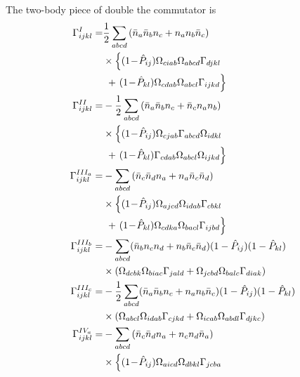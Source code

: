 \documentclass[11pt]{article}
\newcommand{\MyRomanNum}[1]{%
\ifcase#1\or I\or II\or III\or IV\or V\or VI\or VII\or VIII\or IX\or X\else #1\fi}
\begin{document}
The two-body piece of double the commutator is
\begin{subequations}\allowdisplaybreaks[4]\label{DoubleCommutator_twobody_all}
\begin{align}
\Gamma^{\MyRomanNum{1}}_{ijkl}  =&\frac{1}{2} \sum_{abcd} \left( \bar{n}_a  \bar{n}_b  {n}_c  +  {n}_a  {n}_b  \bar{n}_c \right) \nonumber\\
& \times \left\{ (1\! -\! \hat P_{ij} ) \Omega_{ciab} \Omega_{abcd} \Gamma_{djkl} \right. \nonumber\\
&~+ \left.  (1\! -\! \hat P_{kl} ) \Omega_{cdab} \Omega_{abcl} \Gamma_{ijkd} \right\}\\
\Gamma^{\MyRomanNum{2}}_{ijkl}   =& 
- \frac{1}{2} \sum_{abcd} \left(   \bar{n}_a \bar{n}_b {n}_c +  \bar{n}_c  {n}_a  {n}_b \right)  \nonumber \\
&\times  \left\{  (1\! -\! \hat P_{ij} )  \Omega_{cjab}  \Gamma_{abcd}  \Omega_{idkl}\right. \nonumber\\
&~+ \left.  (1\! -\! \hat P_{kl} ) \Gamma_{cdab}  \Omega_{abcl} \Omega_{ijkd}  \right\}\\
\Gamma^{\MyRomanNum{3}_a}_{ijkl} =& - \sum_{abcd} \left( \bar{n}_c  \bar{n}_d  {n}_a  +  {n}_a  \bar{n}_c  \bar{n}_d \right)  \nonumber\\
& \times \left\{  (1\! -\! \hat P_{ij} )  \Omega_{ajcd} \Omega_{idab} \Gamma_{cbkl} \right. \nonumber\\
& ~+ \left. (1\! -\! \hat P_{kl} ) \Omega_{cdka} \Omega_{bacl} \Gamma_{ijbd} \right\} \\
\Gamma^{\MyRomanNum{3}_b}_{ijkl}  =& - \sum_{abcd} ( \bar{n}_b  {n}_c  {n}_d  +  {n}_b  \bar{n}_c  \bar{n}_d ) (1 - \hat P_{ij} ) (1 - \hat P_{kl} )  \nonumber\\
& \times \left( \Omega_{dcbk} \Omega_{biac} \Gamma_{jald} + 
 \Omega_{jcbd} \Omega_{balc} \Gamma_{diak} \right) \\
\Gamma^{\MyRomanNum{3}_c}_{ijkl}  =& - \frac{1}{2} \sum_{abcd} (   \bar{n}_a \bar{n}_b {n}_c + {n}_a  {n}_b  \bar{n}_c)  
 (1 - \hat P_{ij} )  (1 - \hat P_{kl} )  \nonumber\\
 & \times  \left(  \Omega_{abcl} \Omega_{idab} \Gamma_{cjkd} +  \Omega_{icab} \Omega_{abdl} \Gamma_{djkc}   \right)\\
\Gamma^{\MyRomanNum{4}_a}_{ijkl}  =&  -   \sum_{abcd} \left(   \bar{n}_c \bar{n}_d {n}_a  +  {n}_c  {n}_d  \bar{n}_a \right) \nonumber \\
& \times \left\{  (1\! -\! \hat P_{ij} ) \Omega_{aicd} \Omega_{dbkl} \Gamma_{jcba} \right. \nonumber \\

\end{align}
\end{subequations}
\end{document}
